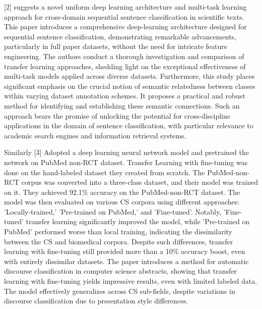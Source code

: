 \documentclass[conference]{IEEEtran}
\begin{document}
[2] suggests a novel uniform deep learning architecture and multi-task learning approach for cross-domain sequential sentence classification in scientific texts. This paper introduces a comprehensive deep-learning architecture designed for sequential sentence classification, demonstrating remarkable advancements, particularly in full paper datasets, without the need for intricate feature engineering. The authors conduct a thorough investigation and comparison of transfer learning approaches, shedding light on the exceptional effectiveness of multi-task models applied across diverse datasets. Furthermore, this study places significant emphasis on the crucial notion of semantic relatedness between classes within varying dataset annotation schemes. It proposes a practical and robust method for identifying and establishing these semantic connections. Such an approach bears the promise of unlocking the potential for cross-discipline applications in the domain of sentence classification, with particular relevance to academic search engines and information retrieval systems.

Similarly [3] Adopted a deep learning neural network model and pretrained the network on PubMed non-RCT dataset. Transfer Learning with fine-tuning was done on the hand-labeled dataset they created from scratch. The PubMed-non-RCT corpus was converted into a three-class dataset, and their model was trained on it. They achieved 92.1\% accuracy on the PubMed-non-RCT dataset. The model was then evaluated on various CS corpora using different approaches: 'Locally-trained,' 'Pre-trained on PubMed,' and 'Fine-tuned'. Notably, 'Fine-tuned' transfer learning significantly improved the model, while 'Pre-trained on PubMed' performed worse than local training, indicating the dissimilarity between the CS and biomedical corpora. Despite such differences, transfer learning with fine-tuning still provided more than a 10\% accuracy boost, even with entirely dissimilar datasets. The paper introduces a method for automatic discourse classification in computer science abstracts, showing that transfer learning with fine-tuning yields impressive results, even with limited labeled data. The model effectively generalizes across CS sub-fields, despite variations in discourse classification due to presentation style differences.
\end{document}
